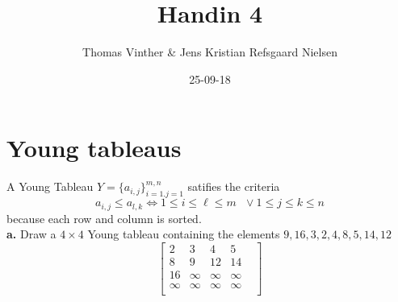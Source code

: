 \documentclass{article}
\theoremstyle{remark}
\numberwithin{equation}{section}
\begin{document}
	\author{Thomas Vinther \& Jens Kristian Refsgaard Nielsen}
	\title{Handin 4}
	\date{25-09-18}
	\maketitle
	\section*{Young tableaus}
A Young Tableau $Y=\{a_{i,j}\}_{i=1.j=1}^{m,n}$ satifies the criteria
\begin{equation}\label{YT}
	a_{i,j} \leq a_{l,k} \iff 1\leq i\leq\ell\leq m \text{ } \vee 1\leq j \leq k \leq n
\end{equation}	
because each row and column is sorted.\\
\textbf{a.} Draw a $4 \times 4 $ Young tableau containing the elements ${9,16,3,2,4,8,5,14,12}$
\\

$$\begin{bmatrix}
2       & 3 & 4 & 5  \\
8       & 9 & 12 & 14 &  \\
16      & \infty &\infty  &\infty \\
\infty	& \infty & \infty & \infty\\
\end{bmatrix}$$
\end{document}
